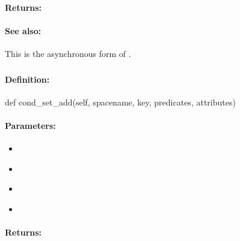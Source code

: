 \paragraph{Returns:}


\paragraph{See also:}  This is the asynchronous form of .

\pagebreak
\subsubsection{}
\label{api:python:cond_set_add}


\paragraph{Definition:}
\begin{pythoncode}
def cond_set_add(self, spacename, key, predicates, attributes)
\end{pythoncode}

\paragraph{Parameters:}
\begin{itemize}[noitemsep]
\item {}\\

\item {}\\

\item {}\\

\item {}\\

\end{itemize}

\paragraph{Returns:}


